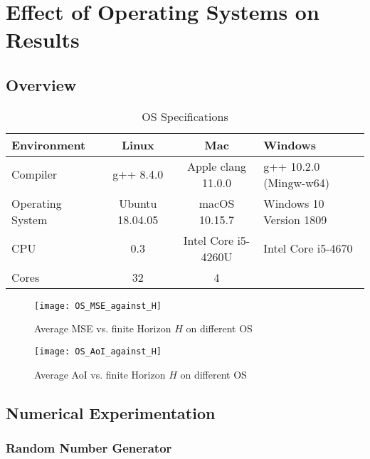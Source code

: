\chapter{Effect of Operating Systems on Results}

\section{Overview}

\begin{table}[htb]
  \begin{center}
  \begin{tabular}{|l|c|c|>{\centering\arraybackslash}p{3.4cm}|} 
  \hline
  \textbf{Environment} & \textbf{Linux} & \textbf{Mac} & \textbf{Windows} \\
  \hline \hline
  Compiler & g++ 8.4.0 & Apple clang 11.0.0 & g++ 10.2.0 (Mingw-w64) \\ 
  Operating System & Ubuntu 18.04.05 & macOS 10.15.7 & Windows 10 Version 1809 \\ 
  CPU & 0.3 & Intel Core i5-4260U & Intel Core i5-4670 \\
  Cores & 32 & 4 & 4 \\
  \hline
  \end{tabular}
  \end{center}
  \caption{OS Specifications}
  \label{tab:OSspecs}
\end{table}

\begin{figure}[htbp]
  \centering
  \texttt{[image: OS\_MSE\_against\_H]} 
  \caption{Average MSE vs. finite Horizon $H$ on different OS}
  \label{fig:OSmse}
\end{figure}

\begin{figure}[htbp]
  \centering
  \texttt{[image: OS\_AoI\_against\_H]} 
  \caption{Average AoI vs. finite Horizon $H$ on different OS}
  \label{fig:OSaoi}
\end{figure}

\section{Numerical Experimentation}

\subsection{Random Number Generator}

